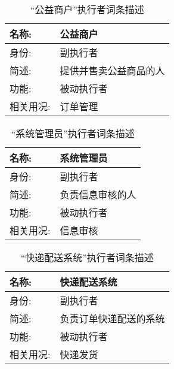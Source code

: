 \begin{table}[H]  
\caption{“公益商户”执行者词条描述}  
\begin{center}  
    \begin{tabular}{l p{11cm}} 
        \hline
        \quad 名称:  &  公益商户 \\
        \hline
        \quad 身份:  & 副执行者 \\
        \hline
        \quad 简述:  & 提供并售卖公益商品的人 \\
        \hline
        \quad 功能:  & 被动执行者 \\
        \hline
        \quad 相关用况:  & 订单管理 \\
        \hline
    \end{tabular}
\end{center}
\end{table}

\begin{table}[H]  
\caption{“系统管理员”执行者词条描述}  
\begin{center}  
    \begin{tabular}{l p{11cm}} 
        \hline
        \quad 名称:  &  系统管理员 \\
        \hline
        \quad 身份:  & 副执行者 \\
        \hline
        \quad 简述:  & 负责信息审核的人 \\
        \hline
        \quad 功能:  & 被动执行者 \\
        \hline
        \quad 相关用况:  & 信息审核 \\
        \hline
    \end{tabular}
\end{center}
\end{table}

\begin{table}[H]  
\caption{“快递配送系统”执行者词条描述}  
\begin{center}  
    \begin{tabular}{l p{11cm}} 
        \hline
        \quad 名称:  &  快递配送系统 \\
        \hline
        \quad 身份:  & 副执行者 \\
        \hline
        \quad 简述:  & 负责订单快递配送的系统 \\
        \hline
        \quad 功能:  & 被动执行者 \\
        \hline
        \quad 相关用况:  & 快递发货 \\
        \hline
    \end{tabular}
\end{center}
\end{table}

